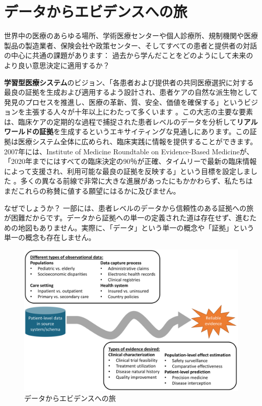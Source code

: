 \documentclass[
  11pt]{book}
\theoremstyle{definition}
\theoremstyle{definition}
\theoremstyle{definition}
\theoremstyle{definition}
\theoremstyle{remark}
\begin{document}
\section{データからエビデンスへの旅}\label{ux30c7ux30fcux30bfux304bux3089ux30a8ux30d3ux30c7ux30f3ux30b9ux3078ux306eux65c5}

世界中の医療のあらゆる場所、学術医療センターや個人診療所、規制機関や医療製品の製造業者、保険会社や政策センター、そしてすべての患者と提供者の対話の中心に共通の課題があります： 過去から学んだことをどのようにして未来のより良い意思決定に適用するか？

\textbf{学習型医療システム}のビジョン、「各患者および提供者の共同医療選択に対する最良の証拠を生成および適用するよう設計され、患者ケアの自然な派生物として発見のプロセスを推進し、医療の革新、質、安全、価値を確保する」というビジョンを主張する人々が十年以上にわたって多くいます \citep{olsen2007learning}。この大志の主要な要素は、臨床ケアの定期的な過程で捕捉された患者レベルのデータを分析して\textbf{リアルワールドの証拠}を生成するというエキサイティングな見通しにあります。この証拠は医療システム全体に広められ、臨床実践に情報を提供することができます。2007年には、Institute of Medicine Roundtable on Evidence-Based Medicineが、「2020年までにはすべての臨床決定の90％が正確、タイムリーで最新の臨床情報によって支援され、利用可能な最良の証拠を反映する」という目標を設定しました \citep{olsen2007learning}。多くの異なる前線で非常に大きな進展があったにもかかわらず、私たちはまだこれらの称賛に値する願望にはるかに及びません。

なぜでしょうか？ 一部には、患者レベルのデータから信頼性のある証拠への旅が困難だからです。データから証拠への単一の定義された道は存在せず、進むための地図もありません。実際に、「データ」という単一の概念や「証拠」という単一の概念も存在しません。

\begin{figure}

{\centering \includegraphics[width=1\linewidth]{images/OhdsiCommunity/datajourney} 

}

\caption{データからエビデンスへの旅}\label{fig:datajourney}
\end{figure}
\end{document}
